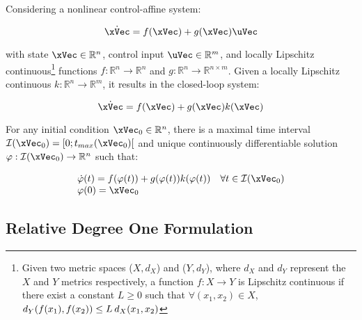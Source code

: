 \section{}
\label{sec:clf_cbf}  

Considering a nonlinear control-affine system:

\begin{equation}
    \dot{\xVec} = f(\xVec) + g(\xVec)\uVec
    \label{eq:Nonlinear-First-Order-System} 
\end{equation}

with state \(\xVec \in \mathbb{R}^n\), control input \(\uVec \in \mathbb{R}^m\), and locally Lipschitz continuous\footnote{Given two metric spaces (\(X, d_X\)) and (\(Y, d_Y\)), where \(d_X\) and \(d_Y\)  represent the \(X\) and \(Y\) metrics respectively, a function \(f:X \to Y\) is Lipschitz continuous if there exist a constant \(L \geq 0\) such that \(\forall (x_1,x_2) \in X\), \hspace{0.4em} \(d_Y(f(x_1),f(x_2))\leq L \hspace{0.2em} d_X(x_1,x_2)\)} functions \(f: \mathbb{R}^n \to \mathbb{R}^n\) and \(g: \mathbb{R}^n \to \mathbb{R}^{n \times m}\). Given a locally Lipschitz continuous \(k: \mathbb{R}^n \to \mathbb{R}^m\), it results in the closed-loop system:

\begin{equation}
    \dot{\xVec} = f(\xVec) + g(\xVec)k(\xVec)
    \label{eq:Nonlinear-First-Order-Closed-Loop-System} 
\end{equation}

For any initial condition \(\xVec_0 \in \mathbb{R}^n\), there is a maximal time interval \(\mathcal{I}(\xVec_0) = [0; t_{max}(\xVec_0)[ \) and unique continuously differentiable solution \(\varphi: \mathcal{I}(\xVec_0) \to \mathbb{R}^n \) such that:

\begin{equation}
    \begin{array}{l}
        \dot{\varphi}(t) = f(\varphi(t))+ g(\varphi(t))k(\varphi(t)) \quad \forall t \in \mathcal{I}(\xVec_0)  \\
        \varphi(0) = \xVec_0
    \end{array}
 \label{eq:Nonlinear-First-Order-Closed-Loop-System-UniqueSol}
\end{equation}

\subsection{Relative Degree One Formulation}
\label{sub:formulation}

